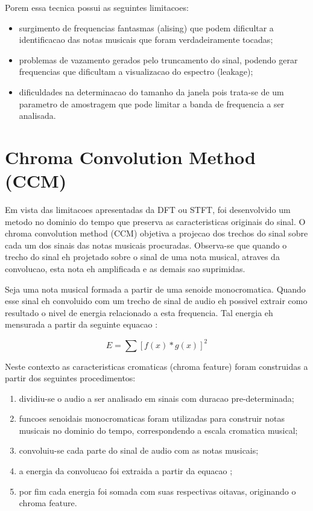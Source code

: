 \documentclass{article}
\begin{document}
	Porem essa tecnica possui as seguintes limitacoes:
	\begin{itemize}
		\item surgimento de frequencias fantasmas (alising) que podem dificultar a identificacao das notas musicais que foram verdadeiramente tocadas;
		\item problemas de vazamento gerados pelo truncamento do sinal, podendo gerar frequencias que dificultam a visualizacao do espectro (leakage);
		\item dificuldades na determinacao do tamanho da janela pois trata-se de um parametro de amostragem que pode limitar a banda de frequencia a ser analisada.
	\end{itemize}


\section{Chroma Convolution Method (CCM)}\label{sec:ccm}

	Em vista das limitacoes apresentadas da DFT ou STFT, foi desenvolvido um metodo no dominio do tempo que preserva as caracteristicas originais do sinal. O chroma convolution method (CCM) objetiva a projecao dos trechos do sinal sobre cada um dos sinais das notas musicais procuradas. Observa-se que quando o trecho do sinal eh projetado sobre o sinal de uma nota musical, atraves da convolucao, esta nota eh amplificada e as demais sao suprimidas.

	Seja uma nota musical formada a partir de uma senoide monocromatica. Quando esse sinal eh convoluido com um trecho de sinal de audio eh possivel extrair como resultado o nivel de energia relacionado a esta frequencia. Tal energia eh mensurada a partir da seguinte equacao :

	\begin{equation}\label{ccm_equation}
		E = \sum [f(x)*g(x)]^{2}
	\end{equation}

	Neste contexto as caracteristicas cromaticas (chroma feature) foram construidas a partir dos seguintes procedimentos:
	\begin{enumerate}
		\item dividiu-se o audio a ser analisado em sinais com duracao pre-determinada;
		\item funcoes senoidais monocromaticas foram utilizadas para construir notas musicais no dominio do tempo, correspondendo a escala cromatica musical; 
		\item convoluiu-se cada parte do sinal de audio com as notas musicais;
		\item a energia da convolucao foi extraida a partir da equacao ;
		\item por fim cada energia foi somada com suas respectivas oitavas, originando o chroma feature.
	\end{enumerate}
\end{document}
